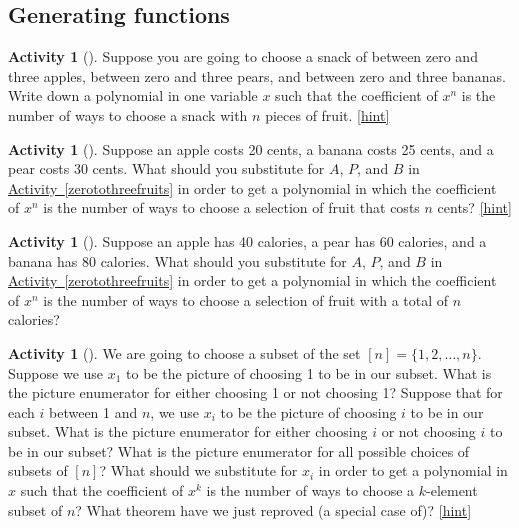 \documentclass[10pt,]{book}
\theoremstyle{plain}
\theoremstyle{definition}
\theoremstyle{definition}
\theoremstyle{definition}
\newtheorem{activity}[project]{Activity}
\numberwithin{equation}{chapter}
\begin{document}
\subsection[{Generating functions}]{Generating functions}\label{subsection-32}
\begin{activity}[]\label{activity-234}
\hypertarget{p-1269}{}%
Suppose you are going to choose a snack of between zero and three apples, between zero and three pears, and between zero and three bananas. Write down a polynomial in one variable \(x\) such that the coefficient of \(x^n\) is the number of ways to choose a snack with \(n\) pieces of fruit.%
\hfill{\tiny\hyperlink{a-241}{[hint]}\hypertarget{q-241}{}}\end{activity}
\begin{activity}[]\label{activity-235}
\hypertarget{p-1272}{}%
Suppose an apple costs 20 cents, a banana costs 25 cents, and a pear costs 30 cents. What should you substitute for \(A\), \(P\), and \(B\) in \hyperref[zerotothreefruits]{Activity~\ref{zerotothreefruits}} in order to get a polynomial in which the coefficient of \(x^n\) is the number of ways to choose a selection of fruit that costs \(n\) cents?%
\hfill{\tiny\hyperlink{a-242}{[hint]}\hypertarget{q-242}{}}\end{activity}
\begin{activity}[]\label{activity-236}
\hypertarget{p-1275}{}%
Suppose an apple has 40 calories, a pear has 60 calories, and a banana has 80 calories. What should you substitute for \(A\), \(P\), and \(B\) in \hyperref[zerotothreefruits]{Activity~\ref{zerotothreefruits}} in order to get a polynomial in which the coefficient of \(x^n\) is the number of ways to choose a selection of fruit with a total of \(n\) calories?%
\end{activity}
\begin{activity}[]\label{reprovingbinomialtheorem}
\hypertarget{p-1277}{}%
We are going to choose a subset of the set \([n]=\{1,2,\ldots, n\}\). Suppose we use \(x_1\) to be the picture of choosing 1 to be in our subset. What is the picture enumerator for either choosing 1 or not choosing 1? Suppose that for each \(i\) between 1 and \(n\), we use \(x_i\) to be the picture of choosing \(i\) to be in our subset. What is the picture enumerator for either choosing \(i\) or not choosing \(i\) to be in our subset? What is the picture enumerator for all possible choices of subsets of \([n]\)? What should we substitute for \(x_i\) in order to get a polynomial in \(x\) such that the coefficient of \(x^k\) is the number of ways to choose a \(k\)-element subset of \(n\)? What theorem have we just reproved (a special case of)?%
\hfill{\tiny\hyperlink{a-244}{[hint]}\hypertarget{q-244}{}}\end{activity}
\end{document}
